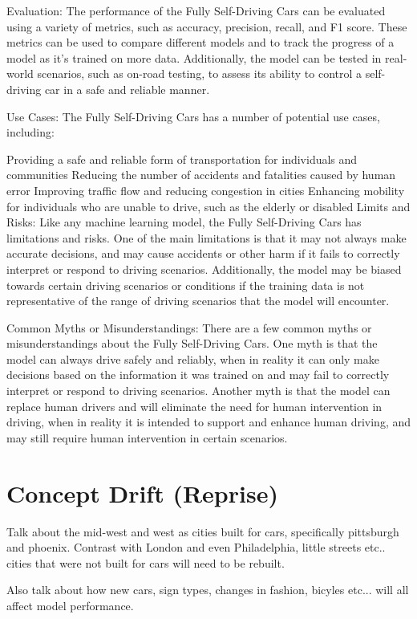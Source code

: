 Evaluation:
The performance of the Fully Self-Driving Cars can be evaluated using a variety of metrics, such as accuracy, precision, recall, and F1 score. These metrics can be used to compare different models and to track the progress of a model as it's trained on more data. Additionally, the model can be tested in real-world scenarios, such as on-road testing, to assess its ability to control a self-driving car in a safe and reliable manner.

Use Cases:
The Fully Self-Driving Cars has a number of potential use cases, including:

Providing a safe and reliable form of transportation for individuals and communities
Reducing the number of accidents and fatalities caused by human error
Improving traffic flow and reducing congestion in cities
Enhancing mobility for individuals who are unable to drive, such as the elderly or disabled
Limits and Risks:
Like any machine learning model, the Fully Self-Driving Cars has limitations and risks. One of the main limitations is that it may not always make accurate decisions, and may cause accidents or other harm if it fails to correctly interpret or respond to driving scenarios. Additionally, the model may be biased towards certain driving scenarios or conditions if the training data is not representative of the range of driving scenarios that the model will encounter.

Common Myths or Misunderstandings:
There are a few common myths or misunderstandings about the Fully Self-Driving Cars. One myth is that the model can always drive safely and reliably, when in reality it can only make decisions based on the information it was trained on and may fail to correctly interpret or respond to driving scenarios. Another myth is that the model can replace human drivers and will eliminate the need for human intervention in driving, when in reality it is intended to support and enhance human driving, and may still require human intervention in certain scenarios.

\section{Concept Drift (Reprise)}

Talk about the mid-west and west as cities built for cars, specifically pittsburgh and phoenix. Contrast with London and even Philadelphia, little streets etc.. cities that were not built for cars will need to be rebuilt.

Also talk about how new cars, sign types, changes in fashion, bicyles etc... will all affect model performance.

